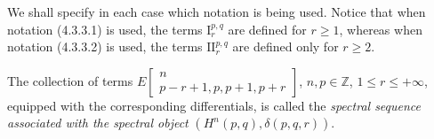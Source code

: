 We shall specify in each case which notation is being used. Notice that when
notation (4.3.3.1) is used, the terms $\mathrm I_r^{p,q}$ are defined for
$r\geq1$, whereas when notation (4.3.3.2) is used, the terms
$\mathrm{II}_r^{p,q}$ are defined only for $r\geq2$.

The collection of terms
$E\!\left[\begin{smallmatrix}n\\p-r+1,p,p+1,p+r\end{smallmatrix}\right]$,
$n,p\in\mathbb Z$, $1\leq r\leq+\infty$, equipped with the corresponding
differentials, is called the \emph{spectral sequence associated with the
spectral object} $(H^n(p,q),\delta(p,q,r))$.
\endgroup
